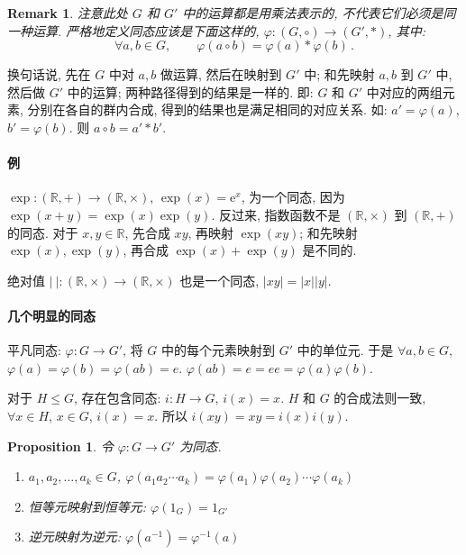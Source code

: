 \documentclass[UTF8]{ctexart}
\theoremstyle{mystyle}
\newtheorem{proposition}{Proposition}[section]
\theoremstyle{myremark}
\newtheorem*{remark}{Remark}
\theoremstyle{plain}
\newcommand{\mr}{\mathrm}
\newcommand{\R}{\mathbb R}
\begin{document}
\begin{remark}
    注意此处 $ G $ 和 $ G' $ 中的运算都是用乘法表示的, 不代表它们必须是同一种运算. 严格地定义同态应该是下面这样的, $ \varphi \colon (G, \circ) \to (G', *) $, 其中:
    \[ \forall a, b \in G, \qquad \varphi(a \circ b) = \varphi(a) * \varphi(b) \,.\]
\end{remark}

换句话说, 先在 $ G $ 中对 $ a, b $ 做运算, 然后在映射到 $ G' $ 中; 和先映射 $ a, b $ 到 $ G' $ 中, 然后做 $ G' $ 中的运算; 两种路径得到的结果是一样的. 即: $ G $ 和 $ G' $ 中对应的两组元素, 分别在各自的群内合成, 得到的结果也是满足相同的对应关系. 如: $ a' = \varphi(a) $, $ b' = \varphi(b) $. 则 $ a \circ b = a' * b' $.

\paragraph{例}
$ \exp \colon (\R, +) \to (\R, \times) $, $ \exp(x) = \mr e^x $, 为一个同态, 因为 $ \exp(x + y) = \exp (x) \exp (y) $. 反过来, 指数函数不是 $ (\R, \times) $ 到 $ (\R, +) $ 的同态. 对于 $ x, y \in \R $, 先合成 $ x y $, 再映射 $ \exp (x y) $; 和先映射 $ \exp(x), \exp(y) $, 再合成 $ \exp(x) + \exp(y) $ 是不同的.

绝对值 $ |~| \colon (\R, \times) \to (\R, \times) $ 也是一个同态, $ |x y| = |x| |y| $.

\paragraph{几个明显的同态}
平凡同态: $ \varphi \colon G \to G' $, 将 $ G $ 中的每个元素映射到 $ G' $ 中的单位元. 于是 $ \forall a, b \in G $, $ \varphi(a) = \varphi(b) = \varphi(a b) = e $. $ \varphi(a b) = e = ee = \varphi(a) \varphi(b) $.

对于 $ H \le G $, 存在包含同态: $ i \colon H \to G $, $ i(x) = x $. $ H $ 和 $ G $ 的合成法则一致, $ \forall x \in H $, $ x \in G $, $ i(x) = x $. 所以 $ i (x y) = x y = i(x) i(y) $.

\begin{proposition}
    令 $ \varphi \colon G \to G' $ 为同态. 
    \begin{enumerate}
        \item $ a_1, a_2, \dots, a_k \in G $, $ \varphi(a_1 a_2 \cdots a_k) = \varphi(a_1) \varphi(a_2) \cdots \varphi(a_k) $
        \item 恒等元映射到恒等元: $ \varphi(1_G) = 1_{G'} $
        \item 逆元映射为逆元: $ \varphi(a^{-1}) = \varphi^{-1}(a) $
    \end{enumerate}
\end{proposition}
\end{document}

